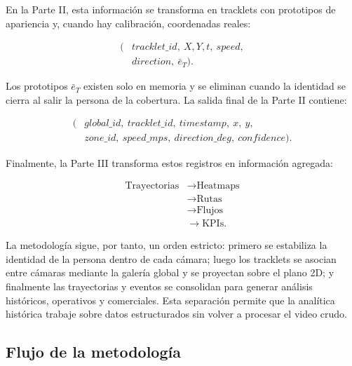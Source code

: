\documentclass[12pt,letterpaper]{article}
\begin{document}
En la Parte II, esta información se transforma en tracklets con
prototipos de apariencia y, cuando hay calibración, coordenadas reales:

\begin{equation}
\begin{aligned}
(&tracklet\_id,\ X,Y,t,\ speed,\\
&direction,\ \bar{e}_T).
\end{aligned}
\end{equation}

Los prototipos $\bar{e}_T$ existen solo en memoria y se eliminan
cuando la identidad se cierra al salir la persona de la cobertura. La
salida final de la Parte II contiene:

\begin{equation}
\begin{aligned}
(&global\_id,\ tracklet\_id,\ timestamp,\ x,\ y,\\
&zone\_id,\ speed\_mps,\ direction\_deg,\ confidence).
\end{aligned}
\end{equation}

Finalmente, la Parte III transforma estos registros en información
agregada:

\begin{equation}
\begin{aligned}
\text{Trayectorias}
&\rightarrow \text{Heatmaps}\\
&\rightarrow \text{Rutas}\\
&\rightarrow \text{Flujos}\\
&\rightarrow \text{KPIs}.
\end{aligned}
\end{equation}

La metodología sigue, por tanto, un orden estricto: primero se estabiliza
la identidad de la persona dentro de cada cámara; luego los tracklets se
asocian entre cámaras mediante la galería global y se proyectan sobre el
plano 2D; y finalmente las trayectorias y eventos se consolidan para
generar análisis históricos, operativos y comerciales. Esta separación
permite que la analítica histórica trabaje sobre datos estructurados sin
volver a procesar el video crudo.

\subsection{Flujo de la metodología}
\end{document}

